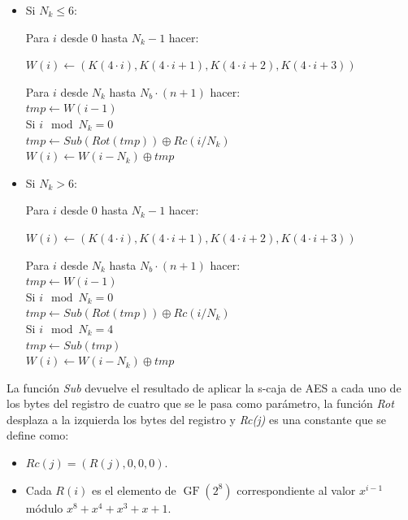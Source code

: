 \begin{itemize}
	\item Si $N_k\le6$:
	\begin{algorithm}
		Para $i$ desde 0 hasta $N_{k}-1$ hacer:
		\begin{description}
			$W(i)\leftarrow(K(4·i), K(4·i+1), K(4·i+2), K(4·i+3))$
		\end{description}
		Para $i$ desde $N_k$ hasta $N_{b}·(n+1)$ hacer:\\
			\hspace*{20}$tmp\leftarrow W(i-1)$\\
			\hspace*{20}Si $i \mod N_k = 0$\\
			\hspace*{40}$tmp\leftarrow Sub(Rot(tmp))\oplus Rc(i/N_k)$\\
			\hspace*{20}$W(i)\leftarrow W(i-N_k)\oplus tmp$
	\end{algorithm}

	\item Si $N_k>6$:
	\begin{algorithm}
		Para $i$ desde 0 hasta $N_{k}-1$ hacer:
		\begin{description}
			$W(i)\leftarrow(K(4·i), K(4·i+1), K(4·i+2), K(4·i+3))$
		\end{description}
		Para $i$ desde $N_k$ hasta $N_{b}·(n+1)$ hacer:\\
			\hspace*{20}$tmp\leftarrow W(i-1)$\\
			\hspace*{20}Si $i \mod N_k = 0$\\
			\hspace*{40}$tmp\leftarrow Sub(Rot(tmp))\oplus Rc(i/N_k)$\\
			\hspace*{20}Si $i \mod N_k = 4$\\
			\hspace*{40}$tmp\leftarrow Sub(tmp)$\\
			\hspace*{20}$W(i)\leftarrow W(i-N_k)\oplus tmp$
	\end{algorithm}
\end{itemize}

La función \emph{Sub} devuelve el resultado de aplicar la s-caja de AES a cada uno de los bytes del registro de cuatro que se le pasa como parámetro, la función \emph{Rot} desplaza a la izquierda los bytes del registro y \emph{Rc(j)} es una constante que se define como:
\begin{itemize}
	\item $Rc(j)=(R(j),0,0,0)$.
	\item Cada $R(i)$ es el elemento de $\operatorname{GF}(2^8)$ correspondiente al valor $x^{i-1}$ módulo $x^8+x^4+x^3+x+1$.
\end{itemize}


